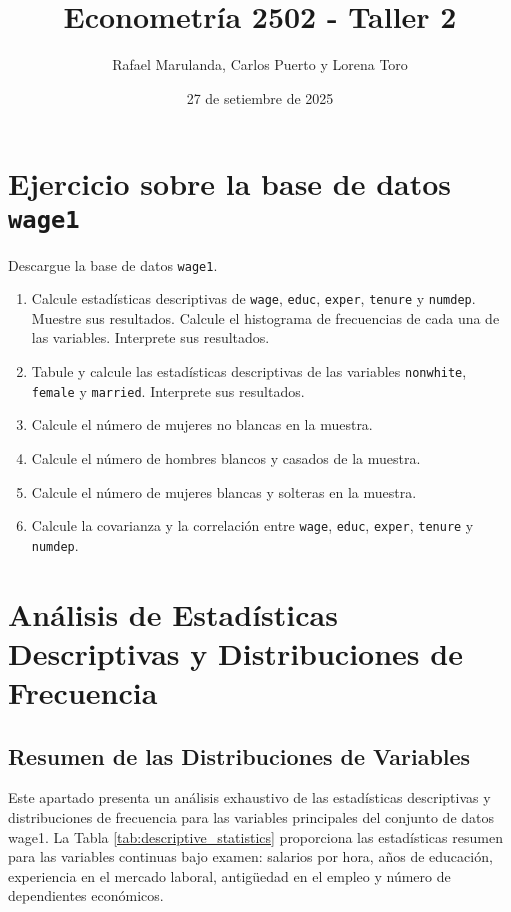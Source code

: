 \documentclass[12pt]{article}
\title{Econometría 2502 - Taller 2}
\author{Rafael Marulanda, Carlos Puerto y Lorena Toro}
\date{27 de setiembre de 2025}
\begin{document}
\maketitle

\section{Ejercicio sobre la base de datos \texttt{wage1}}

Descargue la base de datos \texttt{wage1}.

\begin{enumerate}[label=\alph*)]
    \item Calcule estadísticas descriptivas de \texttt{wage}, \texttt{educ}, \texttt{exper}, \texttt{tenure} y \texttt{numdep}. Muestre sus resultados. Calcule el histograma de frecuencias de cada una de las variables. Interprete sus resultados.
    
    \item Tabule y calcule las estadísticas descriptivas de las variables \texttt{nonwhite}, \texttt{female} y \texttt{married}. Interprete sus resultados.
    
    \item Calcule el número de mujeres no blancas en la muestra.
    
    \item Calcule el número de hombres blancos y casados de la muestra.
    
    \item Calcule el número de mujeres blancas y solteras en la muestra.
    
    \item Calcule la covarianza y la correlación entre \texttt{wage}, \texttt{educ}, \texttt{exper}, \texttt{tenure} y \texttt{numdep}.
\end{enumerate}

\section{Análisis de Estadísticas Descriptivas y Distribuciones de Frecuencia}

\subsection{Resumen de las Distribuciones de Variables}

Este apartado presenta un análisis exhaustivo de las estadísticas descriptivas y distribuciones de frecuencia para las variables principales del conjunto de datos wage1. La Tabla \ref{tab:descriptive_statistics} proporciona las estadísticas resumen para las variables continuas bajo examen: salarios por hora, años de educación, experiencia en el mercado laboral, antigüedad en el empleo y número de dependientes económicos.
\end{document}
